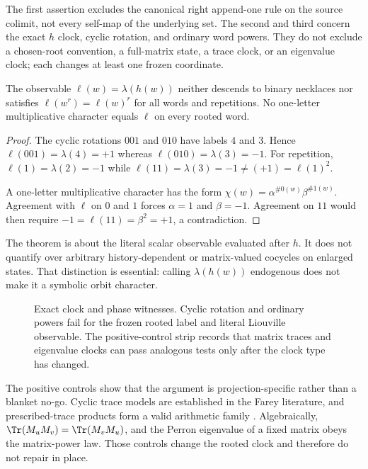 \begin{remark}
The first assertion excludes the canonical right append-one rule on the
source colimit, not every self-map of the underlying set.  The second and
third concern the exact $h$ clock, cyclic rotation, and ordinary word powers.
They do not exclude a chosen-root convention, a full-matrix state, a trace
clock, or an eigenvalue clock; each changes at least one frozen coordinate.
\end{remark}

\begin{theorem}
\label{thm:phase}
The observable $\ell(w)=\lambda(h(w))$ neither descends to binary necklaces
nor satisfies $\ell(w^r)=\ell(w)^r$ for all words and repetitions.  No
one-letter multiplicative character equals $\ell$ on every rooted word.
\end{theorem}
\begin{proof}
The cyclic rotations $001$ and $010$ have labels $4$ and $3$.  Hence
$\ell(001)=\lambda(4)=+1$ whereas
$\ell(010)=\lambda(3)=-1$.  For repetition,
$\ell(1)=\lambda(2)=-1$ while
$\ell(11)=\lambda(3)=-1\ne(+1)=\ell(1)^2$.

A one-letter multiplicative character has the form
$\chi(w)=\alpha^{\#0(w)}\beta^{\#1(w)}$.  Agreement with $\ell$ on $0$ and
$1$ forces $\alpha=1$ and $\beta=-1$.  Agreement on $11$ would then require
$-1=\ell(11)=\beta^2=+1$, a contradiction.
\end{proof}

The theorem is about the literal scalar observable evaluated after $h$.  It
does not quantify over arbitrary history-dependent or matrix-valued cocycles
on enlarged states.  That distinction is essential: calling
$\lambda(h(w))$ endogenous does not make it a symbolic orbit character.

\begin{figure}[H]
  \centering
  \resizebox{0.82\textwidth}{!}{}
  \caption{Exact clock and phase witnesses. Cyclic rotation and ordinary
  powers fail for the frozen rooted label and literal Liouville observable.
  The positive-control strip records that matrix traces and eigenvalue clocks
  can pass analogous tests only after the clock type has changed.}
  \label{fig:clock-phase}
\end{figure}

The positive controls show that the argument is projection-specific rather
than a blanket no-go.  Cyclic trace models are established in the Farey
literature, and prescribed-trace products form a valid arithmetic family
\citep{prellbergFialaKleban2006cluster,technau2023farey}.  Algebraically,
$\Tr(M_uM_v)=\Tr(M_vM_u)$, and the Perron eigenvalue of a fixed matrix obeys
the matrix-power law.  Those controls change the rooted clock and therefore
do not repair  in place.
